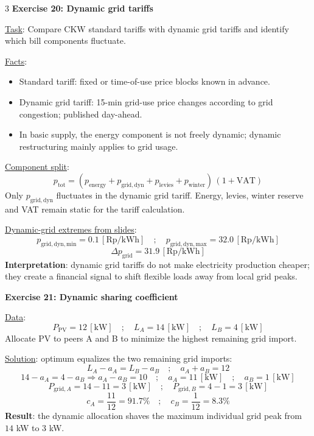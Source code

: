 \documentclass[9pt, landscape, a4paper]{article}
\newcommand{\figbox}[1]{
  \begin{center}
    \fbox{\begin{varwidth}{\textwidth} #1 \end{varwidth}}
  \end{center}
}
\begin{document}
\begin{multicols*}{3}
\textbf{Exercise 20: Dynamic grid tariffs}

\underline{Task}: Compare CKW standard tariffs with dynamic grid tariffs and
identify which bill components fluctuate.

\underline{Facts}:
\begin{itemize}
  \item Standard tariff: fixed or time-of-use price blocks known in advance.
  \item Dynamic grid tariff: 15-min grid-use price changes according to grid
        congestion; published day-ahead.
  \item In basic supply, the energy component is not freely dynamic; dynamic
        restructuring mainly applies to grid usage.
\end{itemize}

\underline{Component split}:
\[
  p_{\mathrm{tot}}
  =(p_{\mathrm{energy}}+p_{\mathrm{grid,dyn}}+p_{\mathrm{levies}}
  +p_{\mathrm{winter}})\,(1+\mathrm{VAT})
\]
Only $p_{\mathrm{grid,dyn}}$ fluctuates in the dynamic grid tariff. Energy,
levies, winter reserve and VAT remain static for the tariff calculation.

\underline{Dynamic-grid extremes from slides}:
\[
  p_{\mathrm{grid,dyn,min}}=0.1\, [\mathrm{Rp/kWh}]
  \quad ; \quad
  p_{\mathrm{grid,dyn,max}}=32.0\, [\mathrm{Rp/kWh}]
\]
\[
  \Delta p_{\mathrm{grid}}=31.9\, [\mathrm{Rp/kWh}]
\]
\textbf{Interpretation}: dynamic grid tariffs do not make electricity
production cheaper; they create a financial signal to shift flexible loads away
from local grid peaks.

\textbf{Exercise 21: Dynamic sharing coefficient}

\underline{Data}:
\[
  P_{\mathrm{PV}}=12\, [\mathrm{kW}]
  \quad ; \quad
  L_A=14\, [\mathrm{kW}]
  \quad ; \quad
  L_B=4\, [\mathrm{kW}]
\]
Allocate PV to peers A and B to minimize the highest remaining grid import.

\figbox{
  $\min P_{\max}$\\[.5ex]
  $a_A+a_B=P_{\mathrm{PV}}
  \quad ; \quad
  0\leq a_A\leq L_A
  \quad ; \quad
  0\leq a_B\leq L_B$\\[.5ex]
  $P_{\max}\geq L_A-a_A
  \quad ; \quad
  P_{\max}\geq L_B-a_B$
}

\underline{Solution}: optimum equalizes the two remaining grid imports:
\[
  L_A-a_A=L_B-a_B
  \quad ; \quad
  a_A+a_B=12
\]
\[
  14-a_A=4-a_B
  \Rightarrow a_A-a_B=10
  \quad ; \quad
  a_A=11\, [\mathrm{kW}]
  \quad ; \quad
  a_B=1\, [\mathrm{kW}]
\]
\[
  P_{\mathrm{grid},A}=14-11=3\, [\mathrm{kW}]
  \quad ; \quad
  P_{\mathrm{grid},B}=4-1=3\, [\mathrm{kW}]
\]
\[
  c_A=\frac{11}{12}=91.7\%
  \quad ; \quad
  c_B=\frac{1}{12}=8.3\%
\]
\textbf{Result}: the dynamic allocation shaves the maximum individual grid
peak from $14$ kW to $3$ kW.


\end{multicols*}
\end{document}
